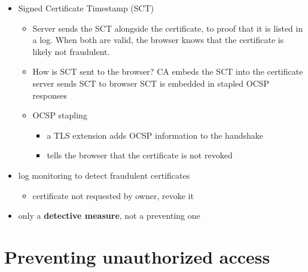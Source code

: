 \documentclass[12pt,titlepage,a4paper]{report}
\begin{document}
\begin{itemize}
\begin{itemize}
			\item Signed Certificate Timestamp (SCT)
			\begin{itemize}
				\item Server sends the SCT alongside the certificate, to proof that it is listed in a log. When both are valid, the browser knows that the certificate is likely not fraudulent.
				\item How is SCT sent to the browser?
					\subitem CA embeds the SCT into the certificate
					\subitem server sends SCT to browser
					\subitem SCT is embedded in stapled OCSP responses
				\item OCSP stapling
				\begin{itemize}
					\item a TLS extension adds OCSP information to the handshake
					\item tells the browser that the certificate is not revoked
				\end{itemize}
			\end{itemize}
			\item log monitoring to detect fraudulent certificates
			\begin{itemize}
				\item certificate not requested by owner, revoke it
			\end{itemize}
		\item only a \textbf{detective measure}, not a preventing one
		\end{itemize}
	\end{itemize}
	
	
	\section{Preventing unauthorized access}
	
\end{document}
